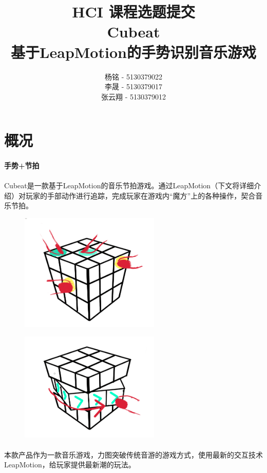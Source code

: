 \documentclass{article} \usepackage{CJK}
\author{杨铭 - 5130379022\\
        李晟 - 5130379017\\
        张云翔 - 5130379012}
\title{HCI 课程选题提交\\\textbf{Cubeat\\
基于LeapMotion的手势识别音乐游戏}}
\begin{document}
\maketitle
\tableofcontents
\newpage
\section{概况}
\paragraph{手势+节拍}
\paragraph{}Cubeat是一款基于LeapMotion的音乐节拍游戏。通过LeapMotion（下文将详细介绍）对玩家的手部动作进行追踪，完成玩家在游戏内“魔方”上的各种操作，契合音乐节拍。
\begin{figure}[!h]
\begin{minipage}{0.5\linewidth}
  \includegraphics[width=18em]{pic1.png}\\
  \caption{}\label{1-1}
\end{minipage}
\begin{minipage}{0.5\linewidth}
  \includegraphics[width=18em]{pic2.png}\\
  \caption{}\label{1-2}
\end{minipage}
\end{figure}
\paragraph{}
本款产品作为一款音乐游戏，力图突破传统音游的游戏方式，使用最新的交互技术LeapMotion，给玩家提供最新潮的玩法。
\end{document}
